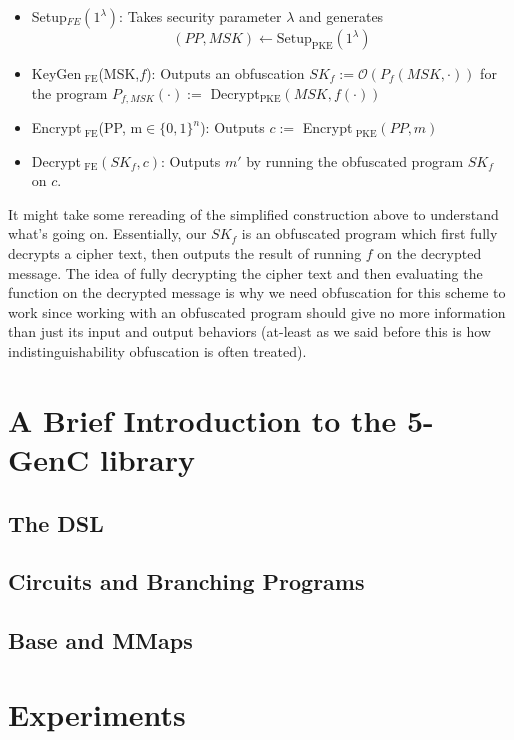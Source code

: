 \documentclass[12pt,twoside]{reedthesis}
\begin{document}
    \begin{itemize}
    \item Setup$_{ FE}(1^\lambda)$: Takes security parameter $\lambda$ and generates
     $$(PP, MSK) \leftarrow \text{Setup}_{\text{PKE}}(1^\lambda)$$
     \item KeyGen$_\text{ FE}$(MSK,$f$): Outputs an obfuscation $SK_f := \mathcal{O}(P_f(MSK, \cdot))$ for the program $P_{f,MSK}(\cdot) :=$ Decrypt$_\text{PKE}(MSK,f(\cdot))$
     \item Encrypt$_\text{ FE}$(PP, m$\in \{ 0,1 \}^n$): Outputs $c :=$ Encrypt$_\text{ PKE}(PP, m)$
     \item Decrypt$_\text{ FE}(SK_f,c)$: Outputs $m'$ by running the obfuscated program $SK_f$ on $c$.

    
    \end{itemize}
    \par It might take some rereading of the simplified construction above to understand what's going on. Essentially, our $SK_f$ is an obfuscated program which first fully decrypts a cipher text, then outputs the result of running $f$ on the decrypted message. The idea of fully decrypting the cipher text and then evaluating the function on the decrypted message is why we need obfuscation for this scheme to work since working with an obfuscated program should give no more information than just its input and output behaviors (at-least as we said before this is how indistinguishability obfuscation is often treated).
    
    
    
    
    \chapter{ A Brief Introduction to the 5-GenC library}
    \section{ The DSL}
    \section{Circuits and Branching Programs}
    \section{Base and MMaps}
    
    \chapter{Experiments}
\end{document}
